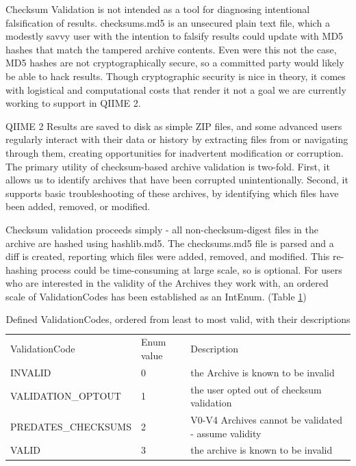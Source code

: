 Checksum Validation is not intended as a tool for diagnosing intentional
falsification of results. checksums.md5 is an unsecured plain text file, which a
modestly savvy user with the intention to falsify results could update with MD5
hashes that match the tampered archive contents. Even were this not the case,
MD5 hashes are not cryptographically secure, so a committed party would likely
be able to hack results. Though cryptographic security is nice in theory, it
comes with logistical and computational costs that render it not a goal we are
currently working to support in QIIME 2.

QIIME 2 Results are saved to disk as simple ZIP files, and some advanced users
regularly interact with their data or history by extracting files from or
navigating through them, creating opportunities for inadvertent modification or
corruption. The primary utility of checksum-based archive validation is
two-fold. First, it allows us to identify archives that have been corrupted
unintentionally. Second, it supports basic troubleshooting of these archives, by
identifying which files have been added, removed, or modified. 

Checksum validation proceeds simply - all non-checksum-digest files in the
archive are hashed using hashlib.md5. The checksums.md5 file is parsed and a
diff is created, reporting which files were added, removed, and modified. This
re-hashing process could be time-consuming at large scale, so is optional. For
users who are interested in the validity of the Archives they work with, an
ordered scale of ValidationCodes has been established as an IntEnum. (Table \ref{tab:validationCodes})

\begin{table}[htp]
    \begin{tabular}{|p{} p{} p{}|}
    \hline
    ValidationCode      & Enum value & Description                                          \\
    INVALID             & 0          & the Archive is known to be invalid                   \\
    VALIDATION\_OPTOUT  & 1          & the user opted out of checksum validation            \\
    PREDATES\_CHECKSUMS & 2          & V0-V4 Archives cannot be validated - assume validity \\
    VALID               & 3          & the archive is known to be invalid                   \\ \hline
    \end{tabular}
    \caption[Defined ValidationCodes, ordered from least to most valid, with their descriptions]%
    {Defined ValidationCodes, ordered from least to most valid, with their descriptions}
    \label{tab:validationCodes}
\end{table}

